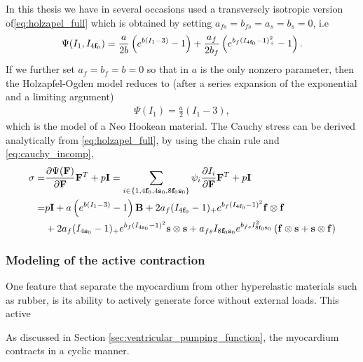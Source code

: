 In this thesis we have in several occasions used a
transversely isotropic version of\eqref{eq:holzapel_full} which is
obtained by setting $a_{fs} = b_{fs}= a_s = b_s = 0$, i.e
\begin{align}
  \label{eq:holzapel_trans}
  \begin{split}
  \Psi(I_1, I_{4\mathbf{f}_0}) = \frac{a}{2 b} \left( e^{ b (I_1 - 3)}  -1 \right)
  + \frac{a_f}{2 b_f} \left( e^{ b_f (I_{4\mathbf{f}_0} - 1)_+^2} -1 \right).
  \end{split}
\end{align}
If we further set $a_f = b_f = b = 0$ so that in $a$ is the
only nonzero parameter, then the Holzapfel-Ogden model reduces to (after a
series expansion of the exponential and a limiting argument)
\begin{align}
  \Psi(I_1)  = \frac{a}{2} \left( I_1 - 3 \right), 
\end{align}
which is the model of a Neo Hookean material. The Cauchy stress can be derived
analytically from \eqref{eq:holzapel_full}, by using the chain rule and
\eqref{eq:cauchy_incomp}, 
\begin{align}
  \begin{split}
    \mathbf{\sigma}
    =& \frac{\partial \Psi(\mathbf{F})}{\partial \mathbf{F}}\mathbf{F}^{T} + p \mathbf{I}
    = \sum_{i \in \left\{ 1, 4\mathbf{f}_0,  4\mathbf{s}_0,  8\mathbf{f}_0\mathbf{s}_0 \right\} }
    \psi_i \frac{\partial I_i}{\partial \mathbf{F}}\mathbf{F}^{T} + p \mathbf{I} \\
    =& p \mathbf{I} + a \left( e^{ b (I_1 - 3)}  -1 \right) \mathbf{B} 
    + 2 a_f (I_{4\mathbf{f}_0} - 1)_+  e^{ b_f (I_{4\mathbf{f}_0} - 1)^2} \mathbf{f} \otimes \mathbf{f} \\
    &+ 2 a_f (I_{4\mathbf{s}_0} - 1)_+  e^{ b_f (I_{4\mathbf{s}_0} - 1)^2} \mathbf{s} \otimes \mathbf{s} 
    + a_{fs} I_{8\mathbf{f}_0\mathbf{s}_0}  e^{ b_{fs} I_{8\mathbf{f}_0\mathbf{s}_0}^2} \left( \mathbf{f} \otimes \mathbf{s}  +  \mathbf{s} \otimes \mathbf{f} \right)
  \end{split}
\end{align}


\subsubsection{Modeling of the active contraction}
  

One feature that separate the myocardium from other hyperelastic
materials such as rubber, is its ability to actively generate force
without external loads. This active 

As discussed 
in Section \ref{sec:ventricular_pumping_function}, the myocardium
contracts in a cyclic manner. 

